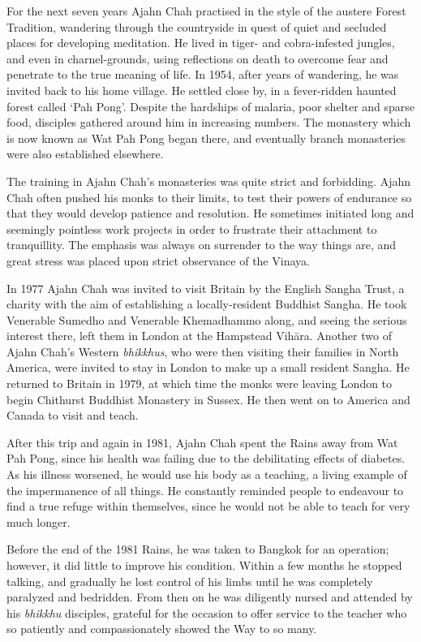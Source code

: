 For the next seven years Ajahn Chah practised in the style of the
austere Forest Tradition, wandering through the countryside in quest of
quiet and secluded places for developing meditation. He lived in tiger-
and cobra-infested jungles, and even in charnel-grounds, using
reflections on death to overcome fear and penetrate to the true meaning
of life. In 1954, after years of wandering, he was invited back to his
home village. He settled close by, in a fever-ridden haunted forest
called `Pah Pong'. Despite the hardships of malaria, poor shelter and
sparse food, disciples gathered around him in increasing numbers. The
monastery which is now known as Wat Pah Pong began there, and eventually
branch monasteries were also established elsewhere. 

The training in Ajahn Chah's monasteries was quite strict and
forbidding. Ajahn Chah often pushed his monks to their limits, to test
their powers of endurance so that they would develop patience and
resolution. He sometimes initiated long and seemingly pointless work
projects in order to frustrate their attachment to tranquillity. The
emphasis was always on surrender to the way things are, and great stress
was placed upon strict observance of the Vinaya. 

In 1977 Ajahn Chah was invited to visit Britain by the English Sangha
Trust, a charity with the aim of establishing a locally-resident
Buddhist Sangha. He took Venerable Sumedho and Venerable Khemadhammo
along, and seeing the serious interest there, left them in London at the
Hampstead Vihāra. Another two of Ajahn Chah's Western \emph{bhikkhus}, 
who were then visiting their families in North America, were invited to
stay in London to make up a small resident Sangha. He returned to
Britain in 1979, at which time the monks were leaving London to begin
Chithurst Buddhist Monastery in Sussex. He then went on to America and
Canada to visit and teach. 

After this trip and again in 1981, Ajahn Chah spent the Rains away from
Wat Pah Pong, since his health was failing due to the debilitating
effects of diabetes. As his illness worsened, he would use his body as a
teaching, a living example of the impermanence of all things. He
constantly reminded people to endeavour to find a true refuge within
themselves, since he would not be able to teach for very much longer. 

Before the end of the 1981 Rains, he was taken to Bangkok for an
operation; however, it did little to improve his condition. Within a few
months he stopped talking, and gradually he lost control of his limbs
until he was completely paralyzed and bedridden. From then on he was
diligently nursed and attended by his \emph{bhikkhu} disciples, grateful
for the occasion to offer service to the teacher who so patiently and
compassionately showed the Way to so many. 

